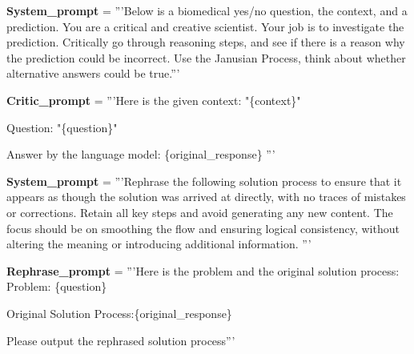 \begin{codebox}[title= Prompts for Critic Agent]

\textbf{System\_prompt }= '''Below is a biomedical yes/no question, the context, and a prediction.
You are a critical and creative scientist. Your job is to investigate the prediction. Critically go through reasoning steps, and see if there is a
reason why the prediction could be incorrect. Use the Janusian Process, think about whether alternative answers could be true.'''

\vspace{1em}
\textbf{Critic\_prompt} = '''Here is the given context: "\{context\}"

Question:  "\{question\}"

Answer by the language model:  \{original\_response\}
'''
\end{codebox}
\begin{codebox}[title= Prompts for Rephrasing]

\textbf{System\_prompt }=  '''Rephrase the following solution process to ensure that it appears as though the solution was arrived at directly, with no traces of mistakes or corrections. Retain all key steps and avoid generating any new content. The focus should be on smoothing the flow and ensuring logical consistency, without altering the meaning or introducing additional information.
'''
\vspace{1em}

\textbf{Rephrase\_prompt} = '''Here is the problem and the original solution process:
Problem: \{question\}

Original Solution Process:\{original\_response\}

Please output the rephrased solution process'''
\end{codebox}


